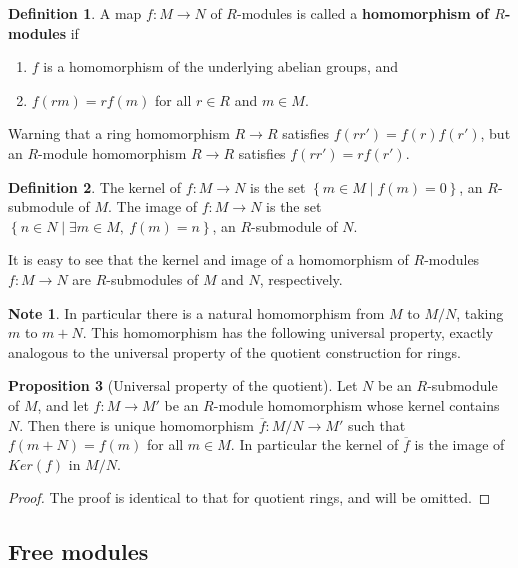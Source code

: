 \documentclass{article}
\newcommand{\rb}[1]{\left( #1 \right)}
\newcommand{\cb}[1]{\left\{ #1 \right\}}
\theoremstyle{definition}\newtheorem{definition}{Definition}[subsection]
\theoremstyle{definition}\newtheorem{remark}[definition]{Remark}
\theoremstyle{definition}\newtheorem*{example}{Example}
\theoremstyle{definition}\newtheorem*{note}{Note}
\newtheorem{proposition}[definition]{Proposition}
\begin{document}
\begin{definition}
A map $ f : M \to N $ of $ R $-modules is called a \textbf{homomorphism of $ R $-modules} if
\begin{enumerate}
\item $ f $ is a homomorphism of the underlying abelian groups, and
\item $ f\rb{rm} = rf\rb{m} $ for all $ r \in R $ and $ m \in M $.
\end{enumerate}
\end{definition}

Warning that a ring homomorphism $ R \to R $ satisfies $ f\rb{rr'} = f\rb{r}f\rb{r'} $, but an $ R $-module homomorphism $ R \to R $ satisfies $ f\rb{rr'} = rf\rb{r'} $.

\begin{definition}
The kernel of $ f : M \to N $ is the set $ \cb{m \in M \mid f\rb{m} = 0} $, an $ R $-submodule of $ M $. The image of $ f : M \to N $ is the set $ \cb{n \in N \mid \exists m \in M, \ f\rb{m} = n} $, an $ R $-submodule of $ N $.
\end{definition}

It is easy to see that the kernel and image of a homomorphism of $ R $-modules $ f : M \to N $ are $ R $-submodules of $ M $ and $ N $, respectively.

\begin{note}
In particular there is a natural homomorphism from $ M $ to $ M / N $, taking $ m $ to $ m + N $. This homomorphism has the following universal property, exactly analogous to the universal property of the quotient construction for rings.
\end{note}

\begin{proposition}[Universal property of the quotient]
Let $ N $ be an $ R $-submodule of $ M $, and let $ f : M \to M' $ be an $ R $-module homomorphism whose kernel contains $ N $. Then there is unique homomorphism $ \overline{f} : M / N \to M' $ such that $ f\rb{m + N} = f\rb{m} $ for all $ m \in M $. In particular the kernel of $ \overline{f} $ is the image of $ Ker\rb{f} $ in $ M / N $.
\end{proposition}

\begin{proof}
The proof is identical to that for quotient rings, and will be omitted.
\end{proof}

\subsection{Free modules}
\end{document}
